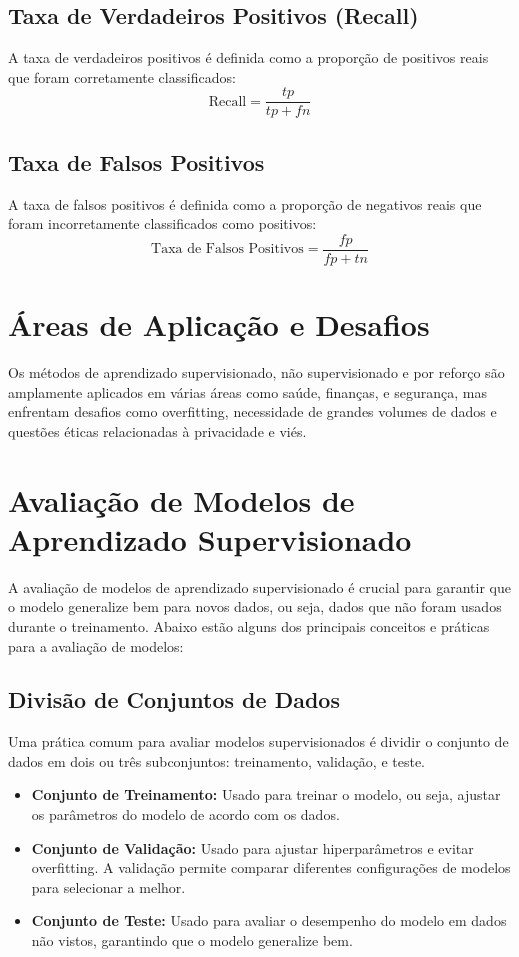\documentclass{article}
\begin{document}
\subsection{Taxa de Verdadeiros Positivos (Recall)}
A taxa de verdadeiros positivos é definida como a proporção de positivos reais que foram corretamente classificados:
\[
\text{Recall} = \frac{tp}{tp + fn}
\]

\subsection{Taxa de Falsos Positivos}
A taxa de falsos positivos é definida como a proporção de negativos reais que foram incorretamente classificados como positivos:
\[
\text{Taxa de Falsos Positivos} = \frac{fp}{fp + tn}
\]

\section{Áreas de Aplicação e Desafios}

Os métodos de aprendizado supervisionado, não supervisionado e por reforço são amplamente aplicados em várias áreas como saúde, finanças, e segurança, mas enfrentam desafios como overfitting, necessidade de grandes volumes de dados e questões éticas relacionadas à privacidade e viés.

\section{Avaliação de Modelos de Aprendizado Supervisionado}

A avaliação de modelos de aprendizado supervisionado é crucial para garantir que o modelo generalize bem para novos dados, ou seja, dados que não foram usados durante o treinamento. Abaixo estão alguns dos principais conceitos e práticas para a avaliação de modelos:

\subsection{Divisão de Conjuntos de Dados}

Uma prática comum para avaliar modelos supervisionados é dividir o conjunto de dados em dois ou três subconjuntos: treinamento, validação, e teste.

\begin{itemize}
    \item \textbf{Conjunto de Treinamento:} Usado para treinar o modelo, ou seja, ajustar os parâmetros do modelo de acordo com os dados.
    \item \textbf{Conjunto de Validação:} Usado para ajustar hiperparâmetros e evitar overfitting. A validação permite comparar diferentes configurações de modelos para selecionar a melhor.
    \item \textbf{Conjunto de Teste:} Usado para avaliar o desempenho do modelo em dados não vistos, garantindo que o modelo generalize bem.
\end{itemize}
\end{document}
